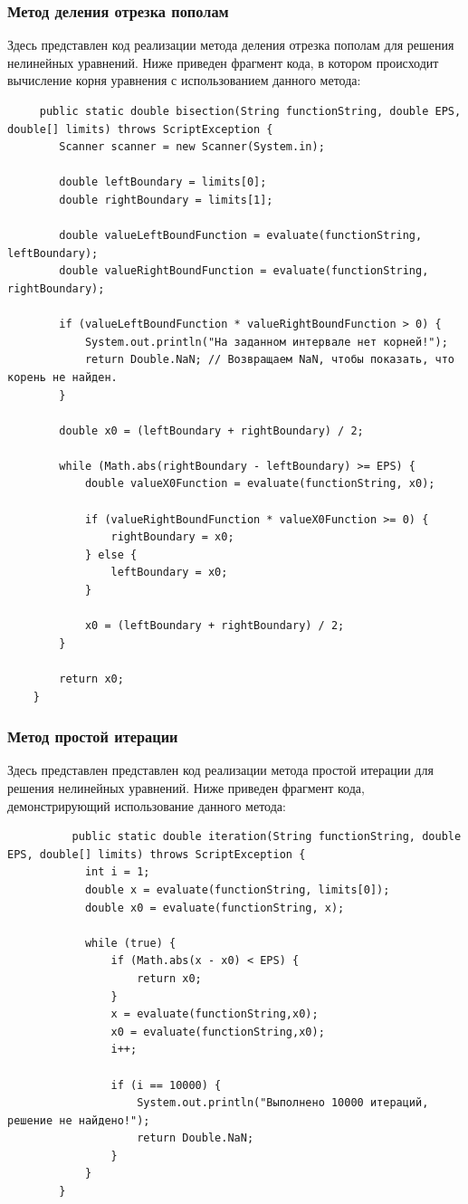 \documentclass[12pt]{article}
\begin{document}
\subsubsection{Метод деления отрезка пополам}
Здесь представлен код реализации метода деления отрезка пополам для решения нелинейных уравнений. Ниже приведен фрагмент кода, в котором происходит вычисление корня уравнения с использованием данного метода:

\begin{verbatim}
     public static double bisection(String functionString, double EPS, double[] limits) throws ScriptException {
        Scanner scanner = new Scanner(System.in);

        double leftBoundary = limits[0];
        double rightBoundary = limits[1];

        double valueLeftBoundFunction = evaluate(functionString, leftBoundary);
        double valueRightBoundFunction = evaluate(functionString, rightBoundary);

        if (valueLeftBoundFunction * valueRightBoundFunction > 0) {
            System.out.println("На заданном интервале нет корней!");
            return Double.NaN; // Возвращаем NaN, чтобы показать, что корень не найден.
        }

        double x0 = (leftBoundary + rightBoundary) / 2;

        while (Math.abs(rightBoundary - leftBoundary) >= EPS) {
            double valueX0Function = evaluate(functionString, x0);

            if (valueRightBoundFunction * valueX0Function >= 0) {
                rightBoundary = x0;
            } else {
                leftBoundary = x0;
            }

            x0 = (leftBoundary + rightBoundary) / 2;
        }

        return x0;
    }
\end{verbatim}

\subsubsection{Метод простой итерации}
Здесь представлен представлен код реализации метода простой итерации для решения нелинейных уравнений. Ниже приведен фрагмент кода, демонстрирующий использование данного метода:

\begin{verbatim}
          public static double iteration(String functionString, double EPS, double[] limits) throws ScriptException {
            int i = 1;
            double x = evaluate(functionString, limits[0]);
            double x0 = evaluate(functionString, x);
    
            while (true) {
                if (Math.abs(x - x0) < EPS) {
                    return x0;
                }
                x = evaluate(functionString,x0);
                x0 = evaluate(functionString,x0);
                i++;
    
                if (i == 10000) {
                    System.out.println("Выполнено 10000 итераций, решение не найдено!");
                    return Double.NaN;
                }
            }
        }
\end{verbatim}
\end{document}
